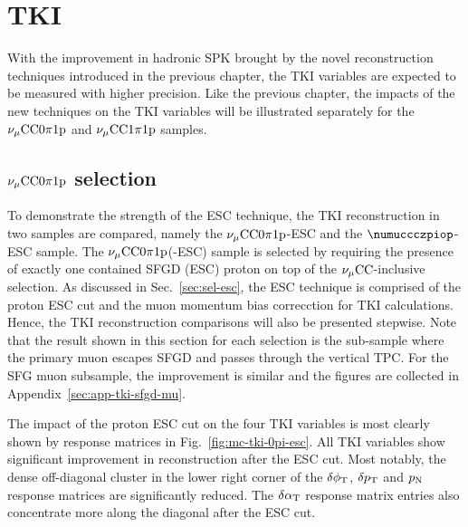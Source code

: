 \section{TKI}
\label{sec:mc-tki}
     With the improvement in hadronic SPK brought by the novel reconstruction techniques introduced in the previous chapter, the TKI variables are expected to be measured with higher precision.
     Like the previous chapter, the impacts of the new techniques on the TKI variables will be illustrated separately for the $\nu_{\mu}\textrm{CC}0\pi1\textrm{p}$ and $\nu_{\mu}\textrm{CC}1\pi1\textrm{p}$ samples.

     \subsection{$\nu_{\mu}\textrm{CC}0\pi1\textrm{p}$ selection}
     \label{sec:mc-tki-0pi}
          To demonstrate the strength of the ESC technique, the TKI reconstruction in two samples are compared, namely the $\nu_{\mu}\textrm{CC}0\pi1\textrm{p}$-ESC and the $\numuccczpiop$-ESC sample.
          The $\nu_{\mu}\textrm{CC}0\pi1\textrm{p}$(-ESC) sample is selected by requiring the presence of exactly one contained SFGD (ESC) proton on top of the $\nu_{\mu}\textrm{CC}$-inclusive selection.
          As discussed in Sec.~\ref{sec:sel-esc}, the ESC technique is comprised of the proton ESC cut and the muon momentum bias correcction for TKI calculations.
          Hence, the TKI reconstruction comparisons will also be presented stepwise.
          Note that the result shown in this section for each selection is the sub-sample where the primary muon escapes SFGD and passes through the vertical TPC. 
          For the SFG muon subsample, the improvement is similar and the figures are collected in Appendix~\ref{sec:app-tki-sfgd-mu}.

          The impact of the proton ESC cut on the four TKI variables is most clearly shown by response matrices in Fig.~\ref{fig:mc-tki-0pi-esc}.
          All TKI variables show significant improvement in reconstruction after the ESC cut.
          Most notably, the dense off-diagonal cluster in the lower right corner of the $\delta\phi_\textrm{T}$, $\delta p_\textrm{T}$ and $p_\textrm{N}$ response matrices are significantly reduced.
          The $\delta\alpha_\textrm{T}$ response matrix entries also concentrate more along the diagonal after the ESC cut.
          
